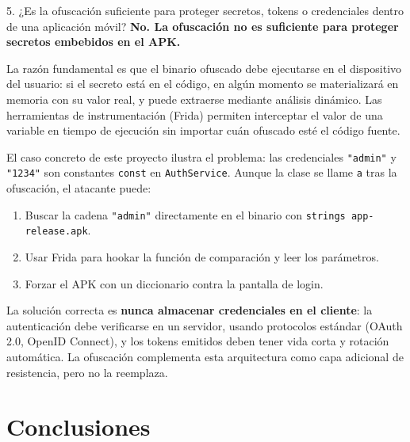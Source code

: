 \documentclass[12pt,a4paper]{article}
\begin{document}
\begin{reflexion}{5. ¿Es la ofuscación suficiente para proteger secretos, tokens o credenciales dentro de una aplicación móvil?}
\textbf{No. La ofuscación no es suficiente para proteger secretos embebidos en el APK.}

La razón fundamental es que el binario ofuscado debe ejecutarse en el dispositivo del usuario: si el secreto está en el código, en algún momento se materializará en memoria con su valor real, y puede extraerse mediante análisis dinámico. Las herramientas de instrumentación (Frida) permiten interceptar el valor de una variable en tiempo de ejecución sin importar cuán ofuscado esté el código fuente.

El caso concreto de este proyecto ilustra el problema: las credenciales \texttt{"admin"} y \texttt{"1234"} son constantes \texttt{const} en \texttt{AuthService}. Aunque la clase se llame \texttt{a} tras la ofuscación, el atacante puede:

\begin{enumerate}
  \item Buscar la cadena \texttt{"admin"} directamente en el binario con \texttt{strings app-release.apk}.
  \item Usar Frida para hookar la función de comparación y leer los parámetros.
  \item Forzar el APK con un diccionario contra la pantalla de login.
\end{enumerate}

La solución correcta es \textbf{nunca almacenar credenciales en el cliente}: la autenticación debe verificarse en un servidor, usando protocolos estándar (OAuth 2.0, OpenID Connect), y los tokens emitidos deben tener vida corta y rotación automática. La ofuscación complementa esta arquitectura como capa adicional de resistencia, pero no la reemplaza.
\end{reflexion}

\section{Conclusiones}
\end{document}
